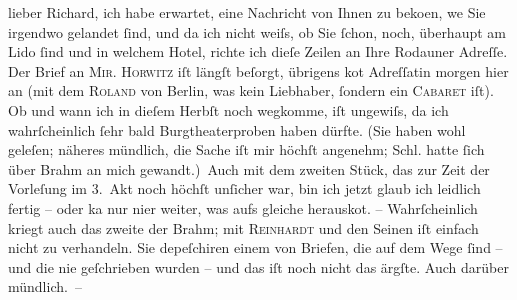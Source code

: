 \pstart
           lieber Richard, ich habe erwartet, eine Nachricht von Ihnen zu
                  beko{\geminationm}en, we{\geminationn} Sie
               irgendwo gelandet ſind, und da ich nicht weiſs, ob Sie ſchon, noch, überhaupt am Lido ſind und in welchem Hotel, richte ich dieſe
               Zeilen an Ihre Rodauner Adreſſe. Der Brief an \textsc{Mir. Horwitz} iſt längſt beſorgt, übrigens ko{\geminationm}t Adreſſatin
               morgen hier an (mit dem \textsc{Roland} von Berlin, was kein Liebhaber, ſondern ein
                  \textsc{Caba{\pb}ret} iſt). Ob und
               wann ich in dieſem Herbſt noch wegkomme, iſt ungewiſs, da ich wahrſcheinlich ſehr
               bald Burgtheaterproben haben dürfte. (Sie haben
               wohl geleſen; näheres mündlich, die Sache iſt mir höchſt angenehm; Schl. hatte ſich über Brahm an mich gewandt.) Auch mit dem zweiten Stück, das zur Zeit der Vorleſung im 3. Akt
               noch höchſt unſicher war, bin ich jetzt glaub ich leidlich fertig – oder ka{\geminationn} nur ni{\geminationm}er weiter, was
               aufs gleiche {\pb}herausko{\geminationm}t.
               – Wahrſcheinlich kriegt auch das zweite der Brahm; mit \textsc{Reinhardt} und den Seinen iſt einfach nicht zu verhandeln. Sie depeſchiren einem von
               Briefen, die auf dem Wege ſind – und die nie geſchrieben wurden – und das iſt noch
               nicht das ärgſte. Auch darüber mündlich. –\pend
           
